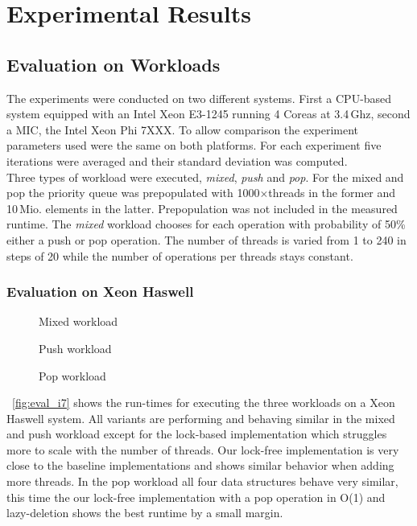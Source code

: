 \section{Experimental Results}
\subsection{Evaluation on Workloads}
\label{sec:exp}
The experiments were conducted on two different systems. First a CPU-based system equipped with an Intel Xeon E3-1245 running 4 Coreas at 3.4\,Ghz, second a MIC, the Intel Xeon Phi 7XXX. To allow comparison the experiment parameters used were the same on both platforms. For each experiment five iterations were averaged and their standard deviation was computed.\\
Three types of workload were executed, \textit{mixed}, \textit{push} and \textit{pop}. For the mixed and pop the priority queue was prepopulated with 1000$\times$threads in the former and 10\,Mio. elements in the latter. Prepopulation was not included in the measured runtime. The \textit{mixed} workload chooses for each operation with probability of 50\% either a push or pop operation. The number of threads is varied from 1 to 240 in steps of 20 while the number of operations per threads stays constant.

\subsubsection{Evaluation on Xeon Haswell}
\begin{figure*}[t]
	\centering
	\begin{subfigure}[b]{0.3\textwidth}
		\centering
		
		\caption{Mixed workload}
		\label{fig:xeon_mixed}
	\end{subfigure}
	\hfill
	\begin{subfigure}[b]{0.3\textwidth}
		\centering
		
		\caption{Push workload}
		\label{fig:xeon_push}
	\end{subfigure}
	\hfill
	\begin{subfigure}[b]{0.3\textwidth}
		\centering
		
		\caption{Pop workload}
		\label{fig:xeon_pop}
	\end{subfigure}
	\caption{Runtime for different workloads executed on a Xeon E3-1245 while varying the number of threads}
	\label{fig:eval_i7}
\end{figure*}
\figurename~\ref{fig:eval_i7} shows the run-times for executing the three workloads on a Xeon Haswell system. All variants are performing and behaving similar in the mixed and push workload except for the lock-based implementation which struggles more to scale with the number of threads. Our lock-free implementation is very close to the baseline implementations and shows similar behavior when adding more threads. In the pop workload all four data structures behave very similar, this time the our lock-free implementation with a pop operation in O(1) and lazy-deletion shows the best runtime by a small margin.

